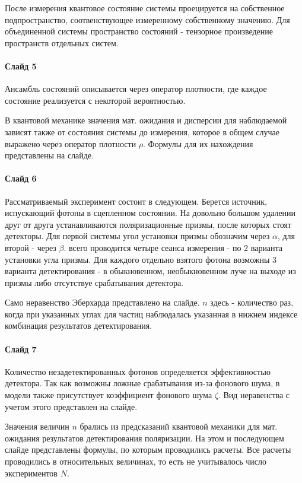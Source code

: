 \documentclass[11pt]{article}
\begin{document}
После измерения квантовое состояние системы проецируется на собственное подпространство, соотвенствующее измеренному собственному значению. Для объединенной системы пространство состояний - тензорное произведение пространств отдельных систем.

\paragraph{Слайд 5}
Ансамбль состояний описывается через оператор плотности, где каждое состояние реализуется с некоторой вероятностью. 

В квантовой механике значения мат. ожидания и дисперсии для наблюдаемой зависят также от состояния системы до измерения, которое в общем случае выражено через оператор плотности $\rho$. Формулы для их нахождения представлены на слайде.

\paragraph{Слайд 6}
Рассматриваемый эксперимент состоит в следующем. Берется источник, испускающий фотоны в сцепленном состоянии. На довольно большом удалении друг от друга устанавливаются поляризационные призмы, после которых стоят детекторы. Для первой системы угол установки призмы обозначим через $\alpha$, для второй - через $\beta$. всего проводится четыре сеанса измерения - по 2 варианта установки угла призмы. Для каждого отдельно взятого фотона возможны 3 варианта детектирования - в обыкновенном, необыкновенном луче на выходе из призмы либо отсутствуе срабатывания детектора.

Само неравенство Эберхарда представлено на слайде. $n$ здесь - количество раз, когда при указанных углах для частиц наблюдалась указанная в нижнем индексе комбинация результатов детектирования.

\paragraph{Слайд 7}
Количество незадетектированных фотонов определяется эффективностью детектора. Так как возможны ложные срабатывания из-за фонового шума, в модели также присутствует коэффициент фонового шума $\zeta$. Вид неравенства с учетом этого представлен на слайде.

Значения величин $n$ брались из предсказаний квантовой механики для мат. ожидания результатов детектирования поляризации. На этом и последующем слайде представлены формулы, по которым проводились расчеты. Все расчеты проводились в относительных величинах, то есть не учитывалось число экспериментов $N$.
\end{document}
